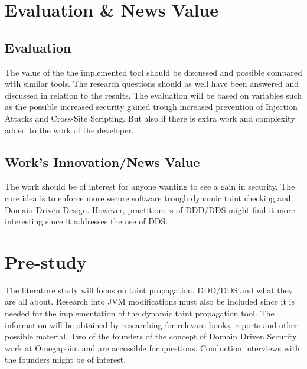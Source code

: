 \documentclass{../kththesis}
\begin{document}
\chapter{Evaluation \& News Value}
\section{Evaluation}
The value of the the implemented tool should be discussed and possible compared with similar tools. The research questions should as well have been answered and discussed in relation to the results. The evaluation will be based on variables such as the possible increased security gained trough increased prevention of Injection Attacks and Cross-Site Scripting. But also if there is extra work and complexity added to the work of the developer.


\section{Work's Innovation/News Value}
The work should be of interest for anyone wanting to see a gain in security. The core idea is to enforce more secure software trough dynamic taint checking and Domain Driven Design. However, practitioners of DDD/DDS might find it more interesting since it addresses the use of DDS.



\chapter{Pre-study}
The literature study will focus on taint propagation, DDD/DDS and what they are all about. Research into JVM modifications must also be included since it is needed for the implementation of the dynamic taint propagation tool. The information will be obtained by researching for relevant books, reports and other possible material. Two of the founders of the concept of Domain Driven Security work at Omegapoint and are accessible for questions. Conduction interviews with the founders might be of interest.
\end{document}
